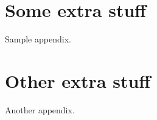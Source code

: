\documentclass{qutad} %
\begin{document}
\lipsum

{
  \cleardoublepage
  \ifdefined{}
  \else
  \fi
}

\printbibliography[title = {REFERENCES}]

\begin{appendices}

  \chapter{Some extra stuff} \label{app1}
  Sample appendix.
  \lipsum
  
  \chapter{Other extra stuff} \label{app2}
  Another appendix.
  \lipsum

\end{appendices}
\end{document}
